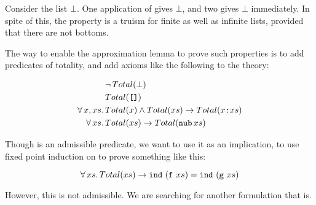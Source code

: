 Consider the list $\bot$. One application of 
gives $\bot$, and two gives $\bot$ immediately. In spite of
this, the property is a truism for finite as well as infinite lists,
provided that there are not bottoms.

The way to enable the approximation lemma to prove such properties is
to add predicates of totality, and add axioms like the following to
the theory:

\begin{align*}
            & \neg \, Total(\bot) \\
            & Total(\hs{[]}) \\
\faa{x}{xs} & Total(x) \wedge Total(xs) \rightarrow Total(x\hs{:}xs) \\
\fa{xs}     & Total(xs) \rightarrow Total(\hs{nub} \, xs) \\
\end{align*}

Though  is an admissible predicate, we want to use it as an
implication, to use fixed point induction on  to prove
something like this:

\begin{equation*}
\fa{xs} Total(xs)\rightarrow \hs{ind} \w (\hs{f} \w xs) = \hs{ind} \w (\hs{g} \w xs)
\end{equation*}

\noindent
However, this is not admissible. We are searching for another
formulation that is.

